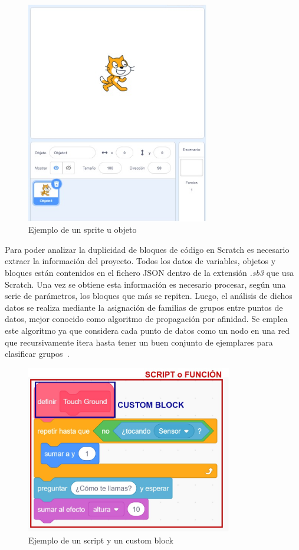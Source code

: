 \documentclass[a4paper, 12pt]{book}
\begin{document}
\begin{figure}[htb!]
	\centering
    \includegraphics[width=8cm, keepaspectratio]{img/scratchsprite.jpg}
    \caption{Ejemplo de un sprite u objeto}
    \label{fig:scratchsprite}
\end{figure}

Para poder analizar la duplicidad de bloques de código en Scratch es necesario extraer la información del proyecto. Todos los datos de variables, objetos y bloques están contenidos en el fichero JSON dentro de la extensión \emph{.sb3} que usa Scratch. Una vez se obtiene esta información es necesario procesar, según una serie de parámetros, los bloques que más se repiten. Luego, el análisis de dichos datos se realiza mediante la asignación de familias de grupos entre puntos de datos, mejor conocido como algoritmo de propagación por afinidad. Se emplea este algoritmo ya que considera cada punto de datos como un nodo en una red que recursivamente itera hasta tener un buen conjunto de ejemplares para clasificar grupos~\cite{clusteringpaper}.

\begin{figure}[htb!]
	\centering
    \includegraphics[width=9cm, keepaspectratio]{img/script.jpg}
    \caption{Ejemplo de un script y un custom block}
    \label{fig:script}
\end{figure}
\end{document}
